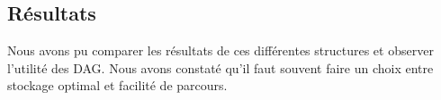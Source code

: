 \documentclass[a4paper]{article}
\begin{document}

\subsection{Résultats} %
\label{sub:r_sultats}
Nous avons pu comparer les résultats de ces différentes structures et observer l'utilité des DAG. Nous avons constaté qu'il faut souvent faire un choix entre stockage optimal et facilité de parcours.

\end{document}
